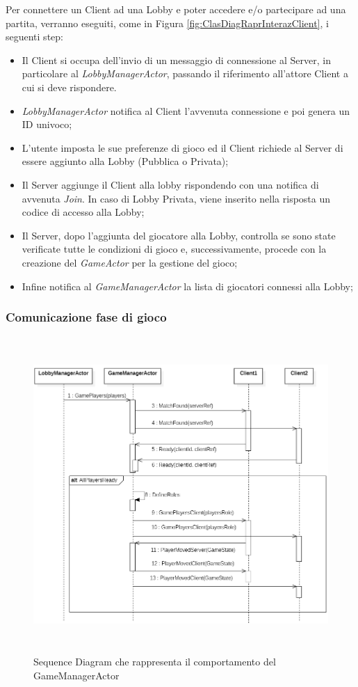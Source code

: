Per connettere un Client ad una Lobby e poter accedere e/o partecipare ad una partita, verranno eseguiti, come in Figura \ref{fig:ClasDiagRaprInterazClient}, i seguenti step:
\begin{itemize}
    \item Il Client si occupa dell'invio di un messaggio di connessione al Server, in particolare al \textit{LobbyManagerActor}, passando il riferimento all'attore Client a cui si deve rispondere.
    \item \textit{LobbyManagerActor} notifica al Client l'avvenuta connessione e poi genera un ID univoco;
    \item L'utente imposta le sue preferenze di gioco ed il Client richiede al Server di essere aggiunto alla Lobby (Pubblica o Privata);
    \item Il Server aggiunge il Client alla lobby rispondendo con una notifica di avvenuta \textit{Join}. In caso di Lobby Privata, viene inserito nella risposta un codice di accesso alla Lobby;
    \item Il Server, dopo l'aggiunta del giocatore alla Lobby, controlla se sono state verificate tutte le condizioni di gioco e, successivamente, procede con la creazione del \textit{GameActor} per la gestione del gioco;
    \item Infine notifica al \textit{GameManagerActor} la lista di giocatori connessi alla Lobby;
\end{itemize}

\subsubsection{Comunicazione fase di gioco}
\begin{figure}[ht]
\centering
\includegraphics[width=13cm, height=12cm]{doc/report/img/GameServer-Seq-diagram.PNG}
\caption{Sequence Diagram che rappresenta il comportamento del GameManagerActor}
\label{fig:ClasDiagRaprCompGameManagerAct}
\end{figure}

